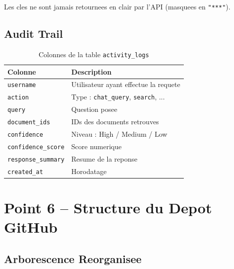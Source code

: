 \documentclass[12pt,a4paper]{article}
\begin{document}
Les cles ne sont jamais retournees en clair par l'API (masquees en \texttt{"***"}).

\subsection{Audit Trail}

\begin{table}[h]
\centering
\caption{Colonnes de la table \texttt{activity\_logs}}
\begin{tabular}{ll}
\toprule
\textbf{Colonne} & \textbf{Description} \\
\midrule
\texttt{username} & Utilisateur ayant effectue la requete \\
\texttt{action} & Type : \texttt{chat\_query}, \texttt{search}, ... \\
\texttt{query} & Question posee \\
\texttt{document\_ids} & IDs des documents retrouves \\
\texttt{confidence} & Niveau : High / Medium / Low \\
\texttt{confidence\_score} & Score numerique \\
\texttt{response\_summary} & Resume de la reponse \\
\texttt{created\_at} & Horodatage \\
\bottomrule
\end{tabular}
\end{table}

\section{Point 6 -- Structure du Depot GitHub}

\subsection{Arborescence Reorganisee}
\end{document}
